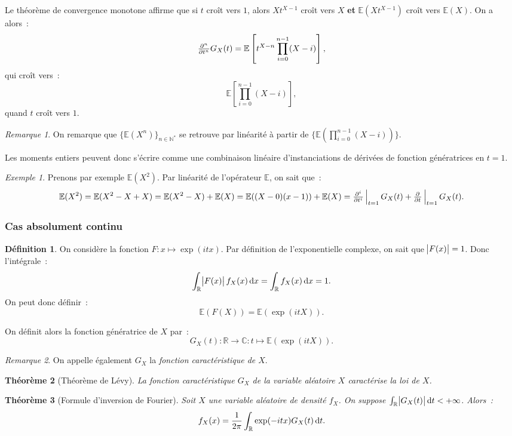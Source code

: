 \documentclass{article}
\newcommand{\C}{\mathbb C}
\newcommand{\E}{\mathbb E}
\newcommand{\N}{\mathbb N}
\newcommand{\R}{\mathbb R}
\newcommand{\evpd}[2]{\pd {}{#1}\sVert[2]_{#1=#2}}  %
\newcommand{\evipd}[3][i]{\pd[i] {}{#2}\sVert[2]_{#2=#3}}  %
\newtheorem{thm}{Théorème}[section]
\theoremstyle{definition}
\newtheorem{déf}[thm]{Définition}
\theoremstyle{remark}
\newtheorem*{rmq}{Remarque}
\newtheorem{ex}{Exemple}
\begin{document}
		Le théorème de convergence monotone affirme que si $t$ croît vers $1$, alors $Xt^{X-1}$ croît vers $X$ \textbf{et} $\E(Xt^{X-1})$ croît vers $\E(X)$.
		On a alors~:
		\[\pd[n] {}tG_X(t) = \E\left[t^{X-n}\prod_{i=0}^{n-1}(X-i)\right],\]
		qui croît vers~:
		\[\E\left[\prod_{i=0}^{n-1}(X-i)\right],\]
		quand $t$ croît vers $1$.

		\begin{rmq} On remarque que $\{\E(X^n)\}_{n \in \N^*}$ se retrouve par linéarité à partir de $\{\E\left(\prod_{i=0}^{n-1}(X-i)\right)\}$.
		
		Les moments entiers peuvent donc s'écrire comme une combinaison linéaire d'instanciations de dérivées de fonction génératrices en $t=1$. \end{rmq}

		\begin{ex} Prenons par exemple $\E(X^2)$. Par linéarité de l'opérateur $\E$, on sait que~:
		\[\E(X^2) = \E(X^2 - X + X) = \E(X^2-X) + \E(X) = \E((X-0)(x-1)) + \E(X) = \evipd[2] t1G_X(t) + \evpd t1G_X(t).\]
		\end{ex}

		\subsubsection{Cas absolument continu}
		\begin{déf} On considère la fonction $F : x \mapsto \exp(itx)$. Par définition de l'exponentielle complexe, on sait que $\abs {F(x)} = 1$.
		Donc l'intégrale~:
		\[\int_\R \abs{F(x)}f_X(x)\dif x = \int_\R f_X(x)\dif x = 1.\]
		On peut donc définir~:
		\[\E(F(X)) = \E(\exp(itX)).\]

		On définit alors la fonction génératrice de $X$ par~:
		\[G_X(t) : \R \to \C : t \mapsto \E(\exp(itX)).\]
		\end{déf}

		\begin{rmq} On appelle également $G_X$ la \emph{fonction caractéristique de $X$}. \end{rmq}

		\begin{thm}[Théorème de Lévy] La fonction caractéristique $G_X$ de la variable aléatoire $X$ caractérise la loi de $X$. \end{thm}

		\begin{thm}[Formule d'inversion de Fourier] Soit $X$ une variable aléatoire de densité $f_X$. On suppose $\int_\R \abs {G_X(t)}\dif t < +\infty$. Alors~:
		\[f_X(x) = \frac 1{2\pi}\int_\R\exp(-itx)G_X(t)\dif t.\]
		\end{thm}
\end{document}
